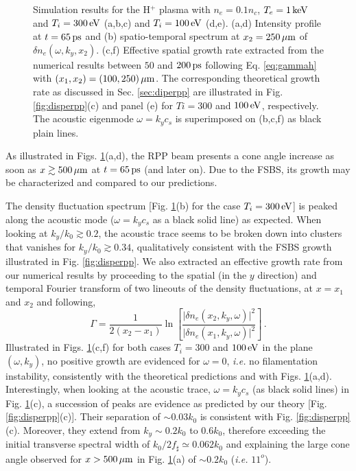 \documentclass[
 reprint,
 amsmath,amssymb,
 aps,
]{revtex4-1}
\begin{document}
\begin{figure}
\begin{tabular}{ccc}
\end{tabular}
\caption{ \label{fig:comphydro}  Simulation results for the H$^+$ plasma with $n_e=0.1n_c$, $T_e=1\,\rm keV$ and $T_i=300\,\rm eV$ (a,b,c) and $T_i=100\,\rm eV$ (d,e).
(a,d) Intensity profile at $t=65\,\rm ps$ and (b) spatio-temporal spectrum at $x_2=250\,\rm\mu m$ of $\delta n_e(\omega,k_y,x_2)$. 
(c,f) Effective spatial growth rate extracted from the numerical results between $50$ and $200\,\rm ps$ following Eq. \eqref{eq:gammah} with $(x_1,x_2)=(100,250)\, \rm \mu m$.
The corresponding theoretical  growth rate as discussed in Sec. \ref{sec:diperpp} are illustrated in Fig. \ref{fig:disperpp}(c) and panel (e) for $Ti=300$ and  $100\, \rm eV$, respectively.
The acoustic eigenmode $\omega=k_yc_s$ is superimposed on (b,c,f) as black plain lines.}
\end{figure}
As illustrated in Figs. \ref{fig:comphydro}(a,d),  the RPP beam presents a cone angle increase as soon as $x\gtrsim 500\,\rm\mu m$ at $t=65\,\rm ps$ (and later on). Due to the FSBS, its growth may be characterized and compared to our predictions. 

The   density fluctuation spectrum [Fig.  \ref{fig:comphydro}(b) for the case $T_i=300\,\rm eV$] is peaked along the acoustic mode ($\omega=k_yc_s$ as a black solid line) as expected. When looking at $k_y/k_0\gtrsim 0.2$, the acoustic trace seems to be broken down into clusters that vanishes for  $k_y/k_0\gtrsim 0.34$, qualitatively consistent with the FSBS growth illustrated in Fig. \ref{fig:disperpp}.
We also extracted an effective growth rate from our numerical results by proceeding to the spatial (in the $y$ direction) and temporal Fourier transform of two lineouts of the density fluctuations, at $x=x_1$ and $x_2$ and following,
\begin{equation}
    \Gamma = \frac{1}{2(x_2-x_1)} \ln \left[\frac{\vert \delta n_e(x_2,k_y,\omega)\vert^2}{\vert \delta n_e(x_1,k_y,\omega)\vert^2}\right] \,. \label{eq:gammah}
\end{equation}
Illustrated in Figs.  \ref{fig:comphydro}(c,f) for both cases $T_i=300$ and $100\, \rm eV$ in the plane $(\omega,k_y)$, no positive growth are evidenced for $\omega=0$, \emph{i.e.} no filamentation instability, consistently with the theoretical predictions and with Figs. \ref{fig:comphydro}(a,d). 
Interestingly, when looking at the acoustic trace, $\omega=k_yc_s$ (as black solid lines) in Fig. \ref{fig:comphydro}(c), a succession of peaks are evidence as predicted by our theory [Fig. \ref{fig:disperpp}(c)]. Their separation of $\sim 0.03 k_0$ is consistent with Fig. \ref{fig:disperpp}(c). Moreover, they extend from $k_y \sim  0.2k_0$  to $0.6k_0$, therefore exceeding the initial transverse spectral width of $k_0/2f_\sharp  \simeq 0.062k_0$ and  explaining the large cone angle   observed for $x>500\,\rm\mu m$ in Fig. \ref{fig:comphydro}(a) of $\sim 0.2k_0$ (\emph{i.e.} $11^o$).
\end{document}
